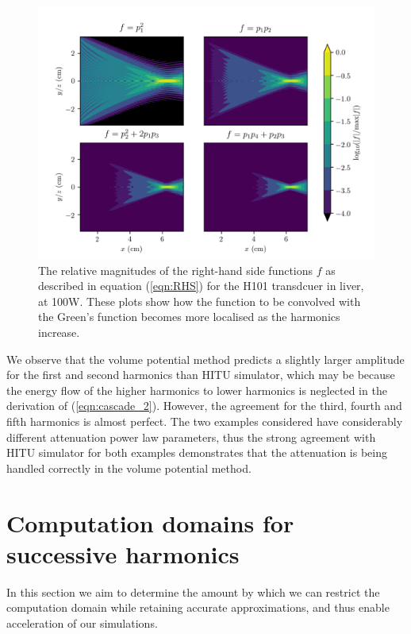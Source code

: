\documentclass[preprint]{JASA}
\newcommand{\red}[1]{{\color{red} #1}}
\begin{document}
\begin{figure}[ht!]
    \centering
    \includegraphics[width=0.95\linewidth]{figures/relative_magnitudes0_H101_power100_material_liver}
    \caption{The relative magnitudes of the right-hand side functions 
    $f$ as described in equation (\ref{eqn:RHS}) for the H101 transdcuer in liver,
    at 100W. These plots show how the function to be convolved with the 
    Green's function becomes more localised as the harmonics increase.}
    \label{fig:relative_magnitudes_H101}
\end{figure} 
We observe that the volume potential method predicts a slightly larger amplitude 
for the first and second harmonics than HITU simulator, \red{which may be because the energy 
flow of the higher harmonics to lower harmonics is neglected in the derivation of 
(\ref{eqn:cascade_2}).} However, the agreement for the third, fourth and 
fifth harmonics is almost perfect. The two examples considered have 
considerably different attenuation power law parameters, thus the strong 
agreement with HITU simulator for both examples demonstrates that the attenuation 
is being handled correctly in the volume potential method.
 
\section{Computation domains for successive harmonics}
\label{sec:results}
In this section we aim to 
determine the amount by which we can restrict the computation domain while 
retaining accurate approximations, and thus enable acceleration of our simulations. 
\end{document}
